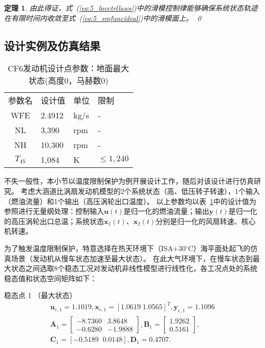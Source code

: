 \documentclass{article}
\newtheorem{theorem}{定理}
\begin{document}
\begin{theorem}
由此得证，式~(\ref{eq:5_lpvctrllaws})中的滑模控制律能够确保系统状态轨迹在有限时间内收敛至式~(\ref{eq:5_smfuncideal})中的滑模面上。
\qed
\end{theorem}

\subsection{设计实例及仿真结果}
\label{sec:5_lpvdesigninst}

\begin{table}[t]
\caption{CF6发动机设计点参数：地面最大状态(高度0，马赫数0)}
\begin{center}
\label{tab:5_lpvnominalpara}
\begin{tabular}{c l l l}
& & \\ %
\hline
参数名 & 设计值 & 单位 &  限制 \\
\hline
WFE  & 2.4912  & kg/s & -  \\
NL & 3,390  & rpm&-  \\
NH & 10,300  & rpm&-  \\
 $T_{45}$ & 1,084 &K&  $\leq 1,240$ \\
\hline
\end{tabular}
\end{center}
\end{table}
不失一般性，本小节以温度限制保护为例开展设计工作，随后对该设计进行仿真研究。
考虑大涵道比涡扇发动机模型的2个系统状态（高、低压转子转速），1个输入（燃油流量）和1个输出（高压涡轮出口温度）。
以上参数均以表~\ref{tab:5_lpvnominalpara}中的设计值为参照进行无量纲处理：控制输入$\bm{u}(t)$是归一化的燃油流量；输出$\bm{y}(t)$是归一化的高压涡轮出口总温；系统状态$\bm{x}_1(t)$、$\bm{x}_2(t)$分别是归一化的风扇转速、核心机转速。

为了触发温度限制保护，特意选择在热天环境下（ISA+30$^{\circ}$C）海平面处起飞的仿真场景（发动机从慢车状态加速至最大状态）。
在此大气环境下，在慢车状态到最大状态之间选取8个稳态工况对发动机非线性模型进行线性化，各工况点处的系统稳态值和状态空间矩阵如下：

稳态点 1 （最大状态）
\begin{equation}
\begin{matrix}
\bm{u}_{e,1}=1.1019,\bm{x}_{e,1}=[1.0619\;1.0565]^{T}, \bm{y}_{e,1} =1.1096 \\
\mathbf{A}_1=
\begin{bmatrix}
-8.7360 & 3.8648\\
-0.6280 & -1.9888
\end{bmatrix},
\mathbf{B}_1=
\begin{bmatrix}
 1.9262 \\
 0.5161
\end{bmatrix},\\
\mathbf{C}_1 = [-0.5189\;\;0.0148],\mathbf{D}_1 = 0.4707.
\end{matrix}
\end{equation}
\end{document}
